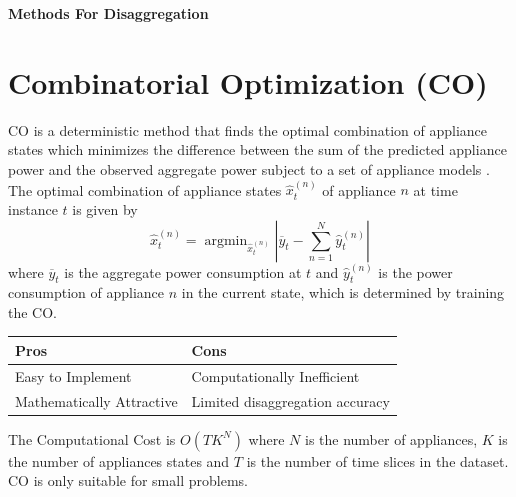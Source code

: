 \documentclass[landscape,fontscale=0.48,margin=2cm,paperwidth=135truecm,paperheight=89truecm]{baposter}
\begin{document}
\begin{poster}
\begin{posterbox}[column=1, height = bottom]{\LARGE \bfseries Methods For Disaggregation}
\section*{Combinatorial Optimization (CO)}
CO is a deterministic method that finds the optimal combination of appliance states which minimizes the difference between the sum of the predicted appliance power and the observed aggregate power subject to a set of appliance models \cite{NILMTK}. The optimal combination of appliance states $\hat{x}^{(n)}_t$ of appliance $n$ at time instance $t$ is given by \cite{Hart}
%
\begin{equation}
\hat{x}^{(n)}_t=\mathop{\mathrm{argmin}}_{\hat{x}^{(n)}_t}\left|\overline{y}_t-\sum_{n=1}^N{\hat{y}_t^{(n)}}\right|
\end{equation}
%
where $\overline{y}_t$ is the aggregate power consumption at $t$ and $\hat{y}_t^{(n)}$ is the power consumption of appliance $n$ in the current state, which is determined by training the CO.

\vspace{1em}
\begin{tabularx}{\linewidth}{X|X}
  \hline
  \bf Pros & \bf Cons \\
  \hline
  \small Easy to Implement & \small Computationally Inefficient\\
  \small Mathematically Attractive & \small Limited disaggregation accuracy\\
  \hline
\end{tabularx}


\vspace{6pt}
The Computational Cost is $O(TK^N)$ where $N$ is the number of appliances, $K$ is the number of appliances states and $T$ is the number of time slices in the dataset. CO is only suitable for small problems.



\end{posterbox}
\end{poster}
\end{document}
